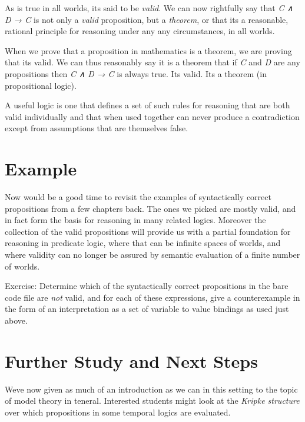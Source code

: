 \documentclass{book}
\begin{document}
As is true in all worlds, it\textquotesingle s said to be \emph{valid}.
We can now rightfully say that \emph{C ∧ D → C} is not
only a \emph{valid} proposition, but a \emph{theorem}, or that it\textquotesingle s a reasonable, rational principle for reasoning under any any circumstances, in all worlds.

When we prove that a proposition in mathematics is a theorem, we are proving that it\textquotesingle s valid. We can thus reasonably say it is a theorem that if \emph{C} and \emph{D} are any propositions then \emph{C ∧ D → C} is always true. It\textquotesingle s valid. It\textquotesingle s a theorem (in propositional logic).

A useful logic is one that defines a set of such rules for reasoning that are both valid individually and that when used together can never produce a contradiction except from assumptions that are themselves false.

\hypertarget{book__pandoc__debug__src__modeltheory.md__example}{%
\section*{Example}\label{book__pandoc__debug__src__modeltheory.md__example}}

Now would be a good time to revisit the examples of
syntactically correct propositions from a few chapters back. The ones we picked are mostly valid, and in fact form the basis for reasoning in many related logics. Moreover the collection of the valid propositions will provide us with a partial foundation for reasoning in predicate logic, where that can be infinite spaces of worlds, and where validity can no longer be assured by semantic evaluation of a finite number of worlds.

Exercise: Determine which of the syntactically correct propositions in the bare code file are \emph{not} valid, and for each of these expressions, give a counterexample in
the form of an interpretation as a set of variable to value bindings as used just above.

\hypertarget{book__pandoc__debug__src__modeltheory.md__further-study-and-next-steps}{%
\section*{Further Study and Next Steps}\label{book__pandoc__debug__src__modeltheory.md__further-study-and-next-steps}}

We\textquotesingle ve now given as much of an introduction as we
can in this setting to the topic of model theory
in teneral. Interested students might look at the
\emph{Kripke structure} over which propositions in some
temporal logics are evaluated.
\end{document}
